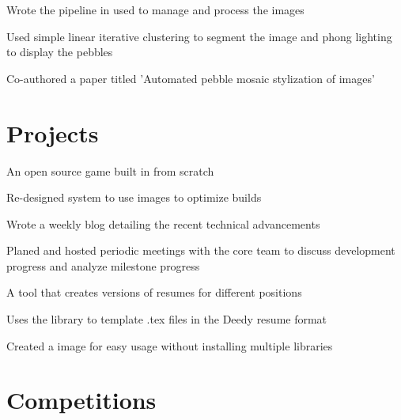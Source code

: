 \documentclass[]{deedy-resume-openfont}
\begin{document}
\begin{minipage}[t]{0.66\textwidth}
\begin{tightemize}
\item Wrote the pipeline in used to manage and process the images

\item Used simple linear iterative clustering to segment the image and phong lighting to display the pebbles

\item Co-authored a paper titled 'Automated pebble mosaic stylization of images'

\end{tightemize}
\sectionsep

\section{Projects}

\begin{tightemize}

\item An open source game built in from scratch

\item Re-designed system to use images to optimize builds

\item Wrote a weekly blog detailing the recent technical advancements

\item Planed and hosted periodic meetings with the core team to discuss development progress and analyze milestone progress

\end{tightemize}
\sectionsep
{}
\begin{tightemize}

\item A tool that creates versions of resumes for different positions

\item Uses the library to template .tex files in the Deedy resume format

\item Created a image for easy usage without installing multiple libraries

\end{tightemize}
\sectionsep

\section{Competitions}


\end{minipage}
\end{document}
